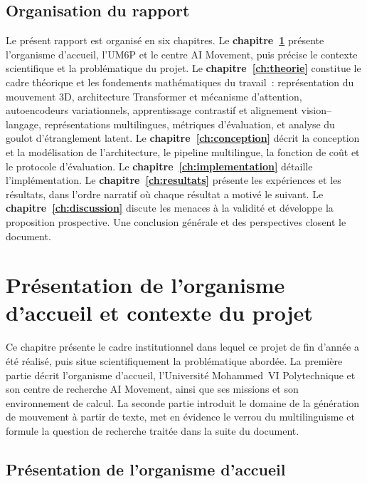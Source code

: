 \documentclass[12pt,a4paper,oneside]{report}
\theoremstyle{definition}
\theoremstyle{plain}
\begin{document}
\section*{Organisation du rapport}

Le présent rapport est organisé en six chapitres. Le
\textbf{chapitre~\ref{ch:org}} présente l'organisme d'accueil, l'UM6P et le
centre AI Movement, puis précise le contexte scientifique et la problématique du
projet. Le \textbf{chapitre~\ref{ch:theorie}} constitue le cadre théorique et les
fondements mathématiques du travail~: représentation du mouvement 3D,
architecture Transformer et mécanisme d'attention, autoencodeurs variationnels,
apprentissage contrastif et alignement vision--langage, représentations
multilingues, métriques d'évaluation, et analyse du goulot d'étranglement
latent. Le \textbf{chapitre~\ref{ch:conception}} décrit la conception et la
modélisation de l'architecture, le pipeline multilingue, la fonction de coût et
le protocole d'évaluation. Le \textbf{chapitre~\ref{ch:implementation}} détaille
l'implémentation. Le \textbf{chapitre~\ref{ch:resultats}} présente les
expériences et les résultats, dans l'ordre narratif où chaque résultat a motivé
le suivant. Le \textbf{chapitre~\ref{ch:discussion}} discute les menaces à la
validité et développe la proposition prospective. Une conclusion générale et des
perspectives closent le document.

\chapter{Présentation de l'organisme d'accueil et contexte du projet}
\label{ch:org}

Ce chapitre présente le cadre institutionnel dans lequel ce projet de fin
d'année a été réalisé, puis situe scientifiquement la problématique abordée. La
première partie décrit l'organisme d'accueil, l'Université Mohammed~VI
Polytechnique et son centre de recherche AI Movement, ainsi que ses missions
et son environnement de calcul. La seconde partie introduit le domaine de la
génération de mouvement à partir de texte, met en évidence le verrou du
multilinguisme et formule la question de recherche traitée dans la suite du
document.

\section{Présentation de l'organisme d'accueil}
\end{document}
